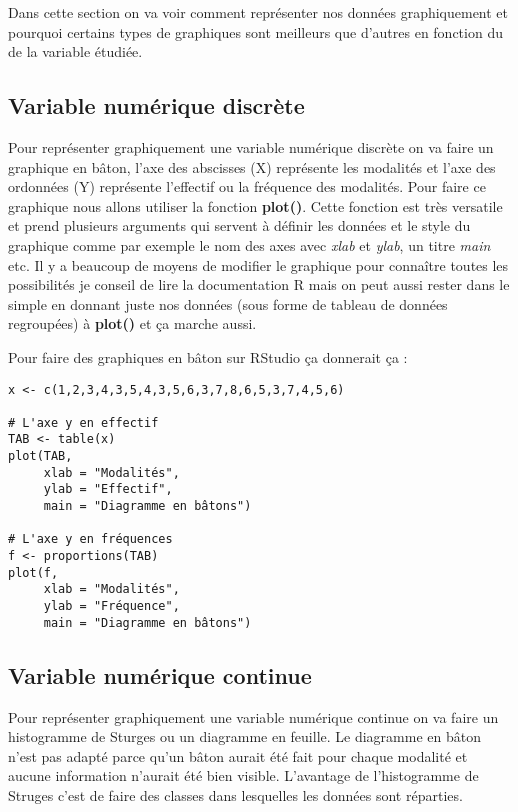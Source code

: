 \documentclass{report}
\begin{document}
Dans cette section on va voir comment représenter nos données graphiquement et pourquoi certains types de graphiques sont meilleurs que d'autres en fonction du de la variable étudiée.

\subsection{Variable numérique discrète}

Pour représenter graphiquement une variable numérique discrète on va faire un graphique en bâton, l'axe des abscisses (X) représente les modalités et l'axe des ordonnées (Y) représente l'effectif ou la fréquence des modalités. Pour faire ce graphique nous allons utiliser la fonction \textbf{plot()}. Cette fonction est très versatile et prend plusieurs arguments qui servent à définir les données et le style du graphique comme par exemple le nom des axes avec \textit{xlab} et \textit{ylab}, un titre \textit{main} etc. Il y a beaucoup de moyens de modifier le graphique pour connaître toutes les possibilités je conseil de lire la documentation R mais on peut aussi rester dans le simple en donnant juste nos données (sous forme de tableau de données regroupées) à \textbf{plot()} et ça marche aussi.

Pour faire des graphiques en bâton sur RStudio ça donnerait ça :

\begin{verbatim}
x <- c(1,2,3,4,3,5,4,3,5,6,3,7,8,6,5,3,7,4,5,6)

# L'axe y en effectif
TAB <- table(x)
plot(TAB,
     xlab = "Modalités",
     ylab = "Effectif",
     main = "Diagramme en bâtons")

# L'axe y en fréquences 
f <- proportions(TAB)
plot(f,
     xlab = "Modalités",
     ylab = "Fréquence",
     main = "Diagramme en bâtons")
\end{verbatim}

\subsection{Variable numérique continue}

Pour représenter graphiquement une variable numérique continue on va faire un histogramme de Sturges ou un diagramme en feuille. Le diagramme en bâton n'est pas adapté parce qu'un bâton aurait été fait pour chaque modalité et aucune information n'aurait été bien visible. L'avantage de l'histogramme de Struges c'est de faire des classes dans lesquelles les données sont réparties.
\end{document}

